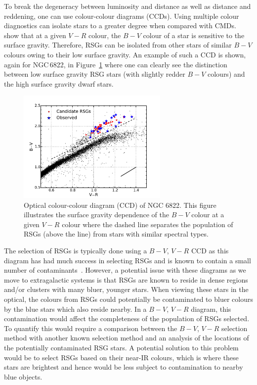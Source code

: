 To break the degeneracy between luminosity and distance as well as distance and reddening, one can use colour-colour diagrams (CCDs).
Using multiple colour diagnostics can isolate stars to a greater degree when compared with CMDs.
\cite{1998ApJ...501..153M} show that at a given $V-R$ colour, the $B-V$ colour of a star is sensitive to the surface gravity.
Therefore, RSGs can be isolated from other stars of similar $B-V$ colours owing to their low surface gravity.
An example of such a CCD  is shown, again for NGC\,6822, in Figure~\ref{fig:CCD} where one can clearly see the distinction between low surface gravity RSG stars (with slightly redder $B-V$ colours) and the high surface gravity dwarf stars.

\begin{figure}
 \centering
 \includegraphics[width=0.65\textwidth]{intro/N6822_bvr}
 \caption[Optical $B-V$, $V-R$ colour--colour diagram]{Optical colour-colour diagram (CCD) of NGC 6822. This figure illustrates the surface gravity dependence of the $B-V$ colour at a given $V-R$ colour where the dashed line separates the population of RSGs (above the line) from stars with similar spectral types.
 \label{fig:CCD}}
\end{figure}

The selection of RSGs is typically done using a $B-V$, $V-R$ CCD as this diagram has had much success in selecting RSGs and is known to contain a small number of contaminants~\citep[e.g.][]{1998ApJ...501..153M,MasseyOlsen03,Levesque05,Levesque06,2012AJ....144....2L,2015ApJ...803...14P}.
However, a potential issue with these diagrams as we move to extragalactic systems is that RSGs are known to reside in dense regions and/or clusters with many bluer, younger stars.
When viewing these stars in the optical, the colours from RSGs could potentially be contaminated to bluer colours by the blue stars which also reside nearby.
In a $B-V$, $V-R$ diagram, this contamination would affect the completeness of the population of RSGs selected.
To quantify this would require a comparison between the $B-V$, $V-R$ selection method with another known selection method and an analysis of the locations of the potentially contaminated RSG stars.
A potential solution to this problem would be to select RSGs based on their near-IR colours, which is where these stars are brightest and hence would be less subject to contamination to nearby blue objects.

